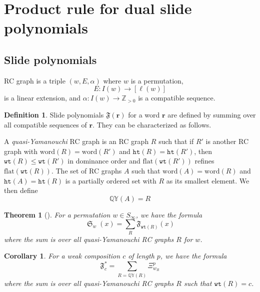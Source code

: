 \documentclass{amsart}
\newtheorem{corollary}[lemma]{Corollary}
\newtheorem{theorem}{Theorem}[section]
\theoremstyle{definition}
\newtheorem{definition}[lemma]{Definition}
\theoremstyle{remark}
\numberwithin{equation}{subsection}
\DeclareMathOperator{\sch}{\mathfrak{S}}
\newcommand{\downvar}[1]{\stackrel{#1}{\searrow}}
\newcommand{\wof}[1]{w_{#1}}
\newcommand{\wtt}{\mathtt{wt}}
\newcommand{\QY}{\ensuremath{\mathbb{QY}}}
\newcommand{\hr}{\mathtt{ht}}
\newcommand{\dsch}{\ensuremath{\Xi}}
\newcommand{\code}{\mathfrak{c}}
\begin{document}

\section{Product rule for dual slide polynomials}
\subsection{Slide polynomials}

RC graph is a triple $(w,E,\alpha)$ where $w$ is a permutation, 
$$E:I(w)\to [\ell(w)]$$
is a linear extension, and $\alpha:I(w)\to \mathbb{Z}_{>0}$ is a compatible sequence.

\begin{definition}
Slide polynomials $\mathfrak{F}(\mathbf{r})$ for a word $\mathbf{r}$ are defined by summing over all compatible sequences of $\mathbf{r}$. They can be characterized as follows.

A \emph{quasi-Yamanouchi} RC graph is an RC graph $R$ such that if $R'$ is another RC graph with $\mathrm{word}(R)=\mathrm{word}(R')$ and $\hr(R)=\hr(R')$, then $\wtt(R)\leq \wtt(R')$ in dominance order and $\mathrm{flat}(\wtt(R'))$ refines $\mathrm{flat}(\wtt(R))$. The set of RC graphs $A$ such that $\mathrm{word}(A)=\mathrm{word}(R)$ and $\hr(A)=\hr(R)$ is a partially ordered set with $R$ as its smallest element. We then define
$$\QY(A)=R$$
\end{definition}

\begin{theorem}[{\cite[Theorem~3.13]{assaf2017slide}}]
  For a permutation $w\in S_\infty$, we have the formula
  $$\sch_w(x) = \sum_{R} \mathfrak{F}_{\wtt(R)}(x)$$
  where the sum is over all quasi-Yamanouchi RC graphs $R$ for $w$.
\end{theorem}
\begin{corollary}
  For a weak composition $c$ of length $p$, we have the formula
  $$\mathfrak{F}_c^* = \sum_{R=\QY(R)} \dsch_{\wof{R}}^p$$
  where the sum is over all quasi-Yamanouchi RC graphs $R$ such that $\wtt(R) = c$.
\end{corollary}
\end{document}
